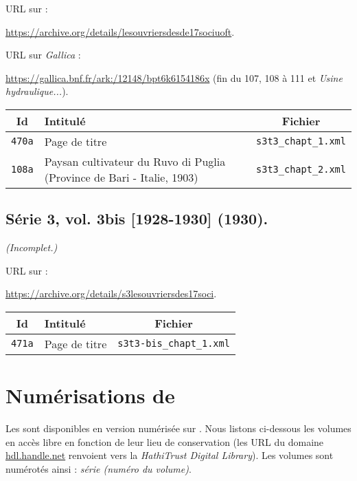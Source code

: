 URL sur \ia{} : 

\url{https://archive.org/details/lesouvriersdesde17sociuoft}.

URL sur \textit{Gallica} : 

\url{https://gallica.bnf.fr/ark:/12148/bpt6k6154186x} (fin du \no{} 107, \no{} 108 à 111 et \textit{Usine hydraulique...}).

\begin{center}
\begin{longtable}{ | c | p{9.5cm} | c | }
\hline
Id & Intitulé & Fichier \\ \hline
\texttt{470a} & Page de titre & \texttt{s3t3\_chapt\_1.xml} \\ \hline
\texttt{108a} & Paysan cultivateur du Ruvo di Puglia (Province de Bari - Italie, 1903) & \texttt{s3t3\_chapt\_2.xml} \\ \hline
\end{longtable}
\end{center}

\subsection{Série 3, vol. 3bis [1928-1930] (1930).}
\label{mappings3t3bis}

\textit{(Incomplet.)}

URL sur \ia{} : 

\url{https://archive.org/details/s3lesouvriersdes17soci}.

\begin{center}
\begin{longtable}{ | c | p{9.5cm} | c | }
\hline
Id & Intitulé & Fichier \\ \hline
\texttt{471a} & Page de titre & \texttt{s3t3-bis\_chapt\_1.xml} \\ \hline
\end{longtable}
\end{center}

\clearpage

\section{Numérisations de \gb}\label{numgb}

Les \odm{} sont disponibles en version numérisée sur \gb. Nous listons ci-dessous les volumes en accès libre en fonction de leur lieu de conservation (les URL du domaine \url{hdl.handle.net} renvoient vers la \textit{HathiTrust Digital Library}). Les volumes sont numérotés ainsi : \textit{série (numéro du volume)}.


